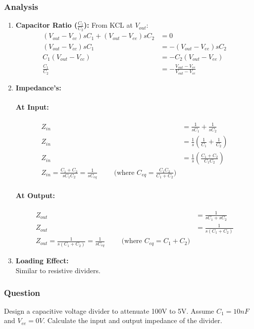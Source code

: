 \subsubsection{Analysis}
\begin{enumerate}
  \item \textbf{Capacitor Ratio (\(\frac{C_1}{C_2}\)):}
    From KCL at \(V_{out}\):
    \begin{align*}
      (V_{out} - V_{cc})sC_1 + (V_{out} - V_{ee})sC_2 &= 0 \\
      (V_{out} - V_{cc})sC_1 &= -(V_{out} - V_{ee})sC_2 \\
      C_1(V_{out} - V_{cc}) &= -C_2(V_{out} - V_{ee}) \\
      \frac{C_1}{C_2} &= -\frac{V_{out} - V_{ee}}{V_{out} - V_{cc}}
    \end{align*}
  \item \textbf{Impedance's:}
    \paragraph{At Input:}
      \begin{align*}
        Z_{in} &= \frac{1}{sC_1} + \frac{1}{sC_2} \\
        Z_{in} &= \frac{1}{s}\left(\frac{1}{C_1} + \frac{1}{C_2}\right) \\
        Z_{in} &= \frac{1}{s}\left(\frac{C_1 + C_2}{C_1 C_2}\right) \\
        Z_{in} = \frac{C_1 + C_2}{s C_1 C_2} = \frac{1}{sC_{eq}} \hspace{1cm} \text{(where \(C_{eq} = \frac{C_1 C_2}{C_1 + C_2}\))}
      \end{align*}
    \paragraph{At Output:}
      \begin{align*}
        Z_{out} &= \frac{1}{sC_1 + sC_2} \\
        Z_{out} &= \frac{1}{s(C_1 + C_2)} \\
        Z_{out} = \frac{1}{s(C_1 + C_2)} = \frac{1}{sC_{eq}} \hspace{1cm} \text{(where \(C_{eq} = C_1 + C_2\))}
      \end{align*}
  \item \textbf{Loading Effect:} \\
    Similar to resistive dividers.
\end{enumerate}

\subsubsection{Question}
Design a capacitive voltage divider to attenuate 100V to 5V.
Assume \(C_1 = 10nF\) and \(V_{ee} = 0V\). Calculate the input
and output impedance of the divider.
